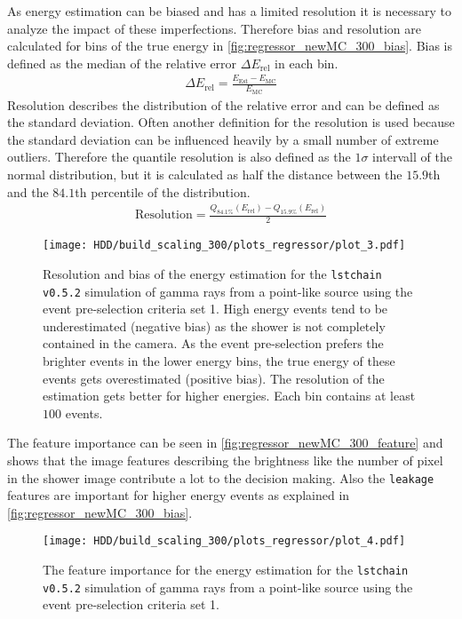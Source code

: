As energy estimation can be biased and has a limited resolution it is necessary to analyze the impact of these imperfections. 
Therefore bias and resolution are calculated for bins of the true energy in \autoref{fig:regressor_newMC_300_bias}.
Bias is defined as the median of the relative error $\Delta E_\text{rel}$ in each bin.
\begin{align}
    \Delta E_\text{rel} = \frac{E_\text{Est} - E_\text{MC}}{E_\text{MC}}
\end{align}
Resolution describes the distribution of the relative error and can be defined as the standard deviation.
Often another definition for the resolution is used because the standard deviation can be influenced heavily by a small number of extreme outliers.
Therefore the quantile resolution is also defined as the $1\sigma$ intervall of the normal distribution, but it is calculated as half the distance 
between the $\num{15.9}$th and the $\num{84.1}$th percentile of the distribution.
\begin{align}
    \text{Resolution} = \frac{Q_\text{84.1\%}(E_\text{rel}) - Q_\text{15.9\%}(E_\text{rel})}{2}
\end{align}
\begin{figure}
    \centering
    \texttt{[image: HDD/build\_scaling\_300/plots\_regressor/plot\_3.pdf]}
    \caption{Resolution and bias of the energy estimation for the \texttt{lstchain v0.5.2} simulation of gamma rays from a point-like source 
        using the event pre-selection criteria set 1.
        High energy events tend to be underestimated (negative bias) as the shower is not completely contained in the camera.
        As the event pre-selection prefers the brighter events in the lower energy bins, the true energy of these events gets overestimated (positive bias).
        The resolution of the estimation gets better for higher energies.
        Each bin contains at least $\num{100}$ events.
    }
    \label{fig:regressor_newMC_300_bias}
\end{figure}

The feature importance can be seen in \autoref{fig:regressor_newMC_300_feature} and shows that the image features describing the brightness 
like the number of pixel in the shower image contribute a lot to the decision making.
Also the \texttt{leakage} features are important for higher energy events as explained in \autoref{fig:regressor_newMC_300_bias}.
\begin{figure}
    \centering
    \texttt{[image: HDD/build\_scaling\_300/plots\_regressor/plot\_4.pdf]}
    \caption{The feature importance for the energy estimation for the \texttt{lstchain v0.5.2} simulation of gamma rays from a point-like source using 
        the event pre-selection criteria set 1.
    }
    \label{fig:regressor_newMC_300_feature}
\end{figure}

